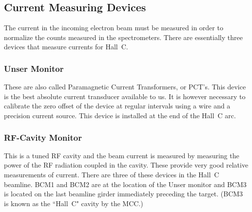 
\subsection{Current Measuring Devices}

The current in the incoming electron beam must be measured in order to
normalize the counts measured in the spectrometers. There are essentially
three devices that measure currents for Hall~C.

\subsubsection{Unser Monitor}  These are also called Paramagnetic Current Transformers,
or PCT's. This device is the best absolute current transducer available to us.
It is however necessary to calibrate the zero offset of the device at
regular intervals using a wire and a precision current source. This device
is installed at the end of the Hall~C arc.
\subsubsection{RF-Cavity Monitor} This is a tuned RF cavity and the beam current
is measured by measuring the power of the RF radiation coupled in the cavity.
These provide very good relative measurements of current. There are three
of these
devices in the Hall~C beamline. BCM1 and BCM2 are at the location of the Unser
monitor and BCM3 is located on the last beamline girder
immediately preceding the target.  (BCM3 is known as the ``Hall~C" cavity 
by the MCC.)


